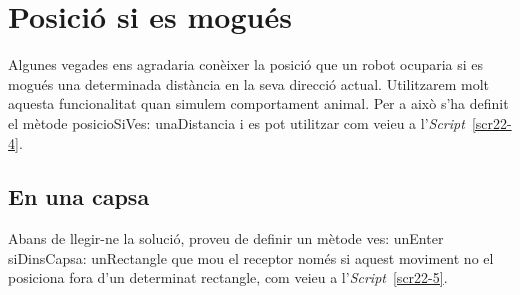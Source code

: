 \section{Posició si es mogués}

Algunes vegades ens agradaria conèixer la posició que un robot ocuparia si es mogués una determinada distància en la seva direcció actual. Utilitzarem molt aquesta funcionalitat quan simulem comportament animal. Per a això s'ha definit el mètode \textsf{posicioSiVes: unaDistancia} i es pot utilitzar com veieu a l'\emph{Script}~\ref{scr22-4}.
\newpage
{}

\subsection{En una capsa}
Abans de llegir-ne la solució, proveu de definir un mètode \textsf{ves: unEnter siDinsCapsa: unRectangle} que mou el receptor només si aquest moviment no el posiciona fora d'un determinat rectangle, com veieu a l'\emph{Script}~\ref{scr22-5}.


